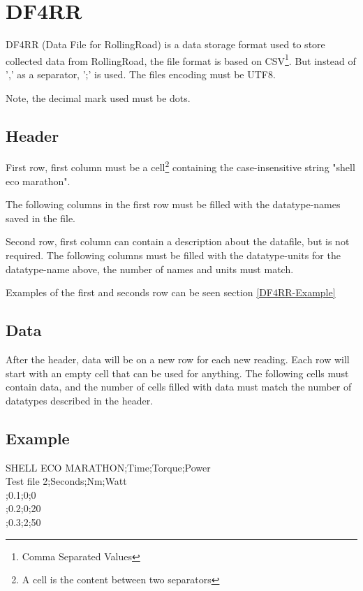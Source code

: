 \section{DF4RR}

DF4RR (Data File for RollingRoad) is a data storage format used to store collected data from RollingRoad, the file format is based on CSV\footnote{Comma Separated Values}\cite{CSVFileDescription}. But instead of ',' as a separator, ';' is used. The files encoding must be UTF8\cite{UTF8Description}.

Note, the decimal mark used must be dots.

\subsection{Header}

First row, first column must be a cell\footnote{A cell is the content between two separators} containing the case-insensitive string "shell eco marathon".

The following columns in the first row must be filled with the datatype-names saved in the file.

Second row, first column can contain a description about the datafile, but is not required. The following columns must be filled with the datatype-units for the datatype-name above, the number of names and units must match. 

Examples of the first and seconds row can be seen section \vref{DF4RR-Example}

\subsection{Data}

After the header, data will be on a new row for each new reading. Each row will start with an empty cell that can be used for anything. The following cells must contain data, and the number of cells filled with data must match the number of datatypes described in the header. 

\subsection{Example}
\label{DF4RR-Example}

SHELL ECO MARATHON;Time;Torque;Power\\
Test file 2;Seconds;Nm;Watt\\
;0.1;0;0\\
;0.2;0;20\\
;0.3;2;50\\
